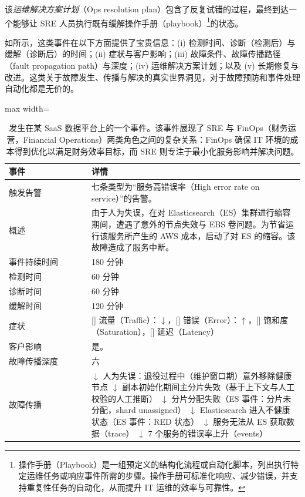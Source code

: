 \documentclass[10pt,UTF8,fontset=fandol]{ctexart}
\newcommand{\cmark}{\ding{51}}
\newcommand{\xmark}{\ding{55}}
\begin{document}
该\textit{运维解决方案计划}（Ops resolution plan）包含了反复试错的过程，最终到达一个能够让 SRE 人员执行既有缓解操作手册（playbook）\footnote{操作手册（Playbook）是一组预定义的结构化流程或自动化脚本，列出执行特定运维任务或响应事件所需的步骤。操作手册可标准化响应、减少错误，并支持重复性任务的自动化，从而提升 IT 运维的效率与可靠性。}的状态。

如所示，这类事件在以下方面提供了宝贵信息：(i) 检测时间、诊断（检测后）与缓解（诊断后）的时间；(ii) 症状与客户影响；(iii) 故障条件、故障传播路径（fault propagation path）与深度；(iv) 运维解决方案计划；以及 (v) 长期修复与改进。这类关于故障发生、传播与解决的真实世界洞见，对于故障预防和事件处理自动化都是无价的。

\begin{table}[H]
\centering
\caption{发生在某 SaaS 数据平台上的一个事件。该事件展现了 SRE 与 FinOps（财务运营，Financial Operations）两类角色之间的复杂关系：FinOps 确保 IT 环境的成本得到优化以满足财务效率目标，而 SRE 则专注于最小化服务影响并解决问题。}
\label{tab:itb9}
\begin{adjustbox}{max width=\linewidth}
\begin{tabular}{@{}p{0.28\linewidth} p{0.72\linewidth}@{}}
\toprule
\textbf{事件} & \textbf{详情} \\
\midrule
触发告警 & 七条类型为“服务高错误率（High error rate on service）”的告警。 \\
\addlinespace
概述 & 由于人为失误，在对 Elasticsearch（ES）集群进行缩容期间，遭遇了意外的节点失效与 EBS 卷问题。为节省运行该服务所产生的 AWS 成本，启动了对 ES 的缩容。该故障造成了服务中断。 \\
\addlinespace
事件持续时间 & 180 分钟 \\
检测时间 & 60 分钟 \\
诊断时间 & 60 分钟 \\
缓解时间 & 120 分钟 \\
症状 & [\cmark] 流量（Traffic）：$\downarrow$，[\cmark] 错误（Error）：$\uparrow$，[\xmark] 饱和度（Saturation），[\xmark] 延迟（Latency） \\
客户影响 & 是。 \\
故障传播深度 & 六 \\
\addlinespace
故障传播 & $\downarrow$ 人为失误：退役过程中（维护窗口期）意外移除健康节点 \newline $\downarrow$ 副本初始化期间主分片失效（基于上下文与人工校验的人工推断） \newline $\downarrow$ 分片分配失败（ES 事件：分片未分配，shard unassigned） \newline $\downarrow$ Elasticsearch 进入不健康状态（ES 事件：RED 状态） \newline $\downarrow$ 服务无法从 ES 获取数据（trace） \newline $\downarrow$ 7 个服务的错误率上升（events） \\

\end{tabular}
\end{adjustbox}
\end{table}
\end{document}

